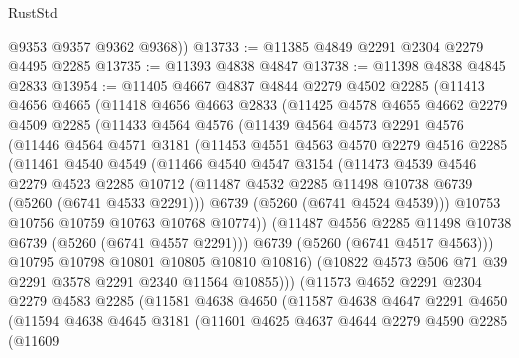 \begin{lexlean}{RustStd}
\begin{coremodule}
        @9353
        @9357
        @9362
        @9368))
@13733 := @11385 @4849 @2291 @2304 @2279 @4495 @2285
@13735 := @11393 @4838 @4847
@13738 := @11398 @4838 @4845 @2833
@13954 := @11405
    @4667
    @4837
    @4844
    @2279
    @4502
    @2285
    (@11413
      @4656
      @4665
      (@11418
        @4656
        @4663
        @2833
        (@11425
          @4578
          @4655
          @4662
          @2279
          @4509
          @2285
          (@11433
            @4564
            @4576
            (@11439
              @4564
              @4573
              @2291
              @4576
              (@11446
                @4564
                @4571
                @3181
                (@11453
                  @4551
                  @4563
                  @4570
                  @2279
                  @4516
                  @2285
                  (@11461
                    @4540
                    @4549
                    (@11466
                      @4540
                      @4547
                      @3154
                      (@11473
                        @4539
                        @4546
                        @2279
                        @4523
                        @2285
                        @10712
                        (@11487 @4532 @2285 @11498 @10738 @6739 (@5260 (@6741 @4533 @2291)))
                        @6739
                        (@5260 (@6741 @4524 @4539)))
                      @10753
                      @10756
                      @10759
                      @10763
                      @10768
                      @10774))
                  (@11487 @4556 @2285 @11498 @10738 @6739 (@5260 (@6741 @4557 @2291)))
                  @6739
                  (@5260 (@6741 @4517 @4563)))
                @10795
                @10798
                @10801
                @10805
                @10810
                @10816)
              (@10822 @4573 @506 @71 @39 @2291 @3578 @2291 @2340 @11564 @10855)))
          (@11573
            @4652
            @2291
            @2304
            @2279
            @4583
            @2285
            (@11581
              @4638
              @4650
              (@11587
                @4638
                @4647
                @2291
                @4650
                (@11594
                  @4638
                  @4645
                  @3181
                  (@11601
                    @4625
                    @4637
                    @4644
                    @2279
                    @4590
                    @2285
                    (@11609

\end{coremodule}
\end{lexlean}
